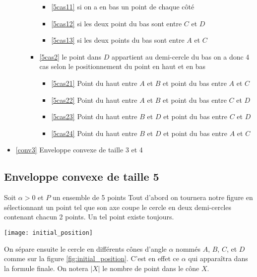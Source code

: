 \begin{itemize}
\begin{itemize}
\begin{itemize}
			\begin{itemize}
				\item \ref{5cas11} si on a en bas un point de chaque côté
				\item \ref{5cas12} si les deux point du bas sont entre $C$ et $D$
				\item \ref{5cas13} si les deux points du bas sont entre $A$ et $C$
			\end{itemize}
			\item \ref{5cas2} le point dans $D$ appartient au demi-cercle du bas
			on a donc 4 cas selon le positionnement du point en haut et en bas
			\begin{itemize}
				\item \ref{5cas21} Point du haut entre $A$ et $B$ et point du bas entre $A$ et $C$
				\item \ref{5cas22} Point du haut entre $A$ et $B$ et point du bas entre $C$ et $D$
				\item \ref{5cas23} Point du haut entre $B$ et $D$ et point du bas entre $C$ et $D$
				\item \ref{5cas24} Point du haut entre $B$ et $D$ et point du bas entre $A$ et $C$
			\end{itemize}
		\end{itemize}
	\end{itemize}
	\item \ref{conv3} Enveloppe convexe de taille 3 et 4
\end{itemize}

\subsection{Enveloppe convexe de taille 5}\label{conv5}

Soit $\alpha > 0$ et $P$ un ensemble de 5 points Tout d'abord on tournera notre figure en sélectionnant un point tel que son axe coupe le cercle en deux demi-cercles contenant chacun 2 points. Un tel point existe toujours.

  \texttt{[image: initial\_position]}

On sépare ensuite le cercle en différents cônes d'angle $\alpha$ nommés $A$,
$B$, $C$, et $D$ comme sur la figure \ref{fig:initial_position}. C'est en effet ce $\alpha$ qui apparaîtra dans la formule finale. On notera $|X|$ le nombre de point dans le cône $X$.

